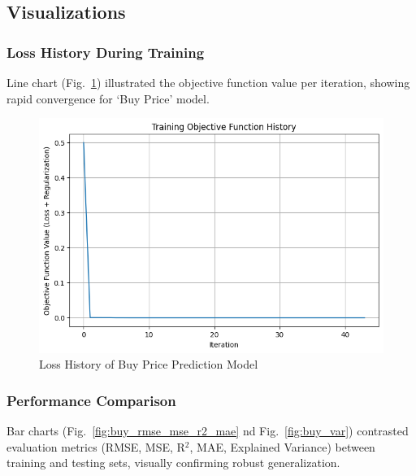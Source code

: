 \subsection{Visualizations}
\label{subsec:visualizations}

\subsubsection{Loss History During Training}\text{}

Line chart (Fig.~\ref{fig:buy_price_model_loss}) illustrated the objective function value per iteration, showing rapid convergence for `Buy Price' model.

\begin{figure}[H]
    \centering
    \includegraphics[width=\linewidth]{images/buy_price_model_loss}
    \caption{Loss History of Buy Price Prediction Model}
    \label{fig:buy_price_model_loss}
\end{figure}

\subsubsection{Performance Comparison}\text{}

Bar charts (Fig.~\ref{fig:buy_rmse_mse_r2_mae} nd Fig.~\ref{fig:buy_var}) contrasted evaluation metrics (RMSE, MSE, R$^2$, MAE, Explained Variance) between training and testing sets, visually confirming robust generalization.

